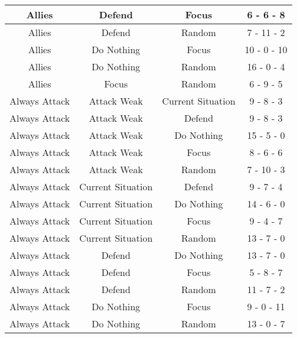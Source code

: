 \documentclass[11pt]{article}
\begin{document}
\begin{longtable}{|c|c|c|c|}
                \hline      Allies       &      Defend       &       Focus       &  6 - 6 - 8  \\
                \hline      Allies       &      Defend       &      Random       & 7 - 11 - 2  \\
                \hline      Allies       &    Do Nothing     &       Focus       & 10 - 0 - 10 \\
                \hline      Allies       &    Do Nothing     &      Random       & 16 - 0 - 4  \\
                \hline      Allies       &       Focus       &      Random       &  6 - 9 - 5  \\
                \hline   Always Attack   &    Attack Weak    & Current Situation &  9 - 8 - 3  \\
                \hline   Always Attack   &    Attack Weak    &      Defend       &  9 - 8 - 3  \\
                \hline   Always Attack   &    Attack Weak    &    Do Nothing     & 15 - 5 - 0  \\
                \hline   Always Attack   &    Attack Weak    &       Focus       &  8 - 6 - 6  \\
                \hline   Always Attack   &    Attack Weak    &      Random       & 7 - 10 - 3  \\
                \hline   Always Attack   & Current Situation &      Defend       &  9 - 7 - 4  \\
                \hline   Always Attack   & Current Situation &    Do Nothing     & 14 - 6 - 0  \\
                \hline   Always Attack   & Current Situation &       Focus       &  9 - 4 - 7  \\
                \hline   Always Attack   & Current Situation &      Random       & 13 - 7 - 0  \\
                \hline   Always Attack   &      Defend       &    Do Nothing     & 13 - 7 - 0  \\
                \hline   Always Attack   &      Defend       &       Focus       &  5 - 8 - 7  \\
                \hline   Always Attack   &      Defend       &      Random       & 11 - 7 - 2  \\
                \hline   Always Attack   &    Do Nothing     &       Focus       & 9 - 0 - 11  \\
                \hline   Always Attack   &    Do Nothing     &      Random       & 13 - 0 - 7  \\

\end{longtable}
\end{document}
